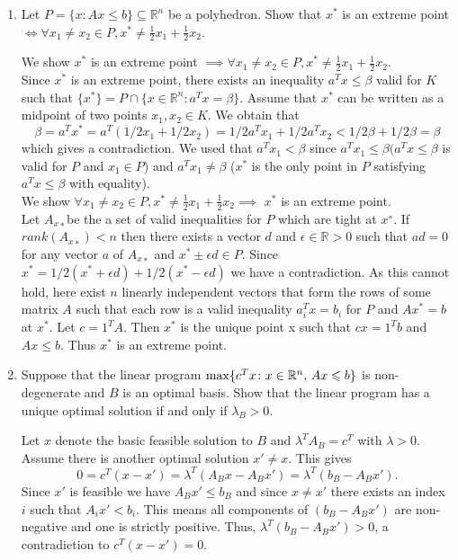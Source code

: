\documentclass[11pt]{article}
\institute{\'Ecole Polytechnique F\'ed\'erale de Lausanne}
\newcommand{\setR}{\mathbb{R}}
\renewcommand{\leq}{\leqslant}
\begin{document}
\makeheader

\begin{enumerate}[1)]
\item Let $P = \{x: A x \leq b\} \subseteq \setR^n$ be a polyhedron. Show that $x^\ast$ is an extreme point $\iff \forall x_1 \neq x_2 \in P, x^\ast \neq \frac{1}{2}x_1 + \frac{1}{2}x_2$. 


\begin{solution}
We show $x^\ast$ is an extreme point $\implies \forall x_1 \neq x_2 \in P, x^\ast \neq \frac{1}{2}x_1 + \frac{1}{2}x_2$.
\\

Since $x^\ast$ is an extreme point, there exists an inequality $a^T x≤β$ valid for $K$ such that $\{x^\ast\}= P∩\{x∈
\setR^n : a^T x= β\}$. Assume that $x^\ast$ can be written as a midpoint of two points $x_1,x_2∈K$. We obtain
that
$$β= a^T x^\ast= a^T (1/2x_1+ 1/2x_2) = 1/2a^T x_1+ 1/2a^T x_2 <1/2β+ 1/2 β= β$$
which gives a contradiction. We used that $a^T x_1 < β$ since $a^T x_1 ≤β (a^T x ≤β$ is valid for $P$ and $x_1 ∈P$) and $a^T x_1\neq β$ ($x^\ast$ is the only point in $P$ satisfying $a^T x≤β$ with equality).\\



We show $\forall x_1 \neq x_2 \in P, x^\ast \neq \frac{1}{2}x_1 + \frac{1}{2}x_2 \implies $ $x^\ast$ is an extreme point. \\


Let $A_{x∗} $be the a set of valid inequalities for $P$ which
are tight at $x^∗$. If $rank(A_{x∗} ) < n$ then there exists a vector $d$ and $\epsilon ∈\setR>0$ such that $ad = 0$ for
any vector $a$ of $A_{x∗}$ and $x^\ast ±\epsilon d \in P$. Since $x^\ast=  1/2(x^\ast + \epsilon d) + 1/2(x^\ast
−\epsilon d)$ we have a contradiction. As this cannot hold, here exist $n$ linearly independent vectors that form the rows of some matrix $A$ such that each row is a valid inequality $a_i^T x = b_i$ for $P$ and $Ax^\ast = b$ at $x^\ast$. Let $c= 1^T A$. Then $x^\ast$ is the unique point x such that $cx= 1^T b$ and $Ax≤b$. Thus $x^\ast$ is an extreme point.

\end{solution}


\item Suppose that the linear program $\max \{c^Tx \colon x \in \R^n, \, Ax \leq b\}$ is non-degenerate and $B$ is an optimal basis. Show that the linear program has a unique optimal solution if and only if $\lambda_B>0$. 


\begin{solution}
Let $x$ denote the basic feasible solution to $B$ and $λ^TA_B = c^T$ with $λ>0$. Assume there is another optimal solution $x' \neq x$. This gives
$$0 = c^T(x−x') = \lambda^T(A_B x - A_Bx') = \lambda^T(b_B - A_Bx').$$
Since $x'$ is feasible we have $A_B x' ≤b_B$ and since $x\neq x'$ there exists an index $i$ such that
$A_ix' < b_i$. This means all components of $(b_B−A_B x')$ are non-negative and one is strictly
positive. Thus, $λ^T (b_B−A_B x') >0$, a contradiction to $c^T(x-x') = 0$.



\end{solution}
\end{enumerate}
\end{document}
